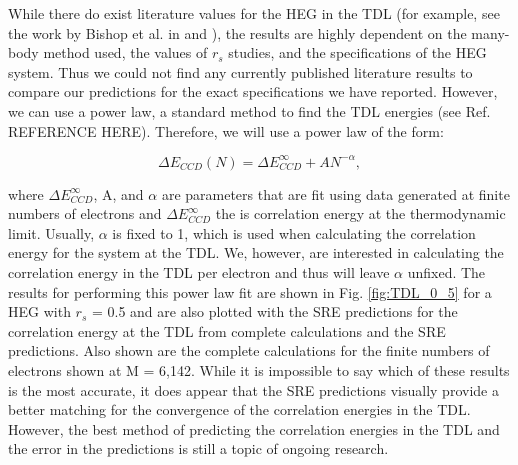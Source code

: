 While there do exist literature values for the HEG in the TDL (for example, see the work by Bishop et al. in \cite{Ref71} and \cite{Ref72}), the results are highly dependent on the many-body method used, the values of $r_s$ studies, and the specifications of the HEG system. Thus we could not find any currently published literature results to compare our predictions for the exact specifications we have reported. However, we can use a power law, a standard method to find the TDL energies (see Ref. REFERENCE HERE). Therefore, we will use a power law of the form:

\begin{equation}
    \Delta E_{CCD}(N) = \Delta E_{CCD}^\infty + AN^{-\alpha},
\end{equation}

where $\Delta E_{CCD}^\infty$, A, and $\alpha$ are parameters that are fit using data generated at finite numbers of electrons and $\Delta E_{CCD}^\infty$ the is correlation energy at the thermodynamic limit. Usually, $\alpha$ is fixed to 1, which is used when calculating the correlation energy for the system at the TDL. We, however, are interested in calculating the correlation energy in the TDL per electron and thus will leave $\alpha$ unfixed. The results for performing this power law fit are shown in Fig. \ref{fig:TDL_0_5} for a HEG with $r_s$ = 0.5 and are also plotted with the SRE predictions for the correlation energy at the TDL from complete calculations and the SRE predictions. Also shown are the complete calculations for the finite numbers of electrons shown at M = 6,142. While it is impossible to say which of these results is the most accurate, it does appear that the SRE predictions visually provide a better matching for the convergence of the correlation energies in the TDL. However, the best method of predicting the correlation energies in the TDL and the error in the predictions is still a topic of ongoing research.


